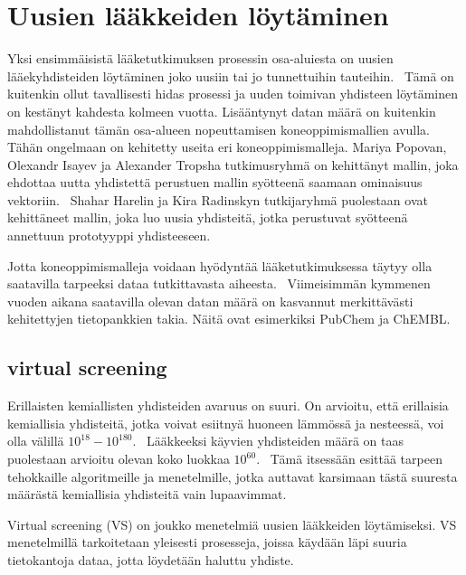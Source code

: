 \documentclass[finnish,twoside,censored,subject,sw-line]{HYthesisML}
\begin{document}
\chapter{Uusien lääkkeiden löytäminen}


Yksi ensimmäisistä lääketutkimuksen prosessin osa-aluiesta on uusien lääekyhdisteiden löytäminen joko uusiin tai jo tunnettuihin tauteihin.~\cite{EkinsSean2019Emlf}
Tämä on kuitenkin ollut tavallisesti hidas prosessi ja uuden toimivan yhdisteen löytäminen on kestänyt kahdesta kolmeen vuotta.
Lisääntynyt datan määrä on kuitenkin mahdollistanut tämän osa-alueen nopeuttamisen koneoppimismallien avulla.
Tähän ongelmaan on kehitetty useita eri koneoppimismalleja.
Mariya Popovan, Olexandr Isayev ja Alexander Tropsha tutkimusryhmä on kehittänyt mallin, joka ehdottaa uutta yhdistettä perustuen mallin syötteenä saamaan ominaisuus vektoriin.~\cite{PopovaMariya2018Drlf}
Shahar Harelin ja Kira Radinskyn tutkijaryhmä puolestaan ovat kehittäneet mallin, joka luo uusia yhdisteitä, jotka perustuvat syötteenä annettuun prototyyppi yhdisteeseen.~\cite{ShaharHarelAndKiraRadinsky}

Jotta koneoppimismalleja voidaan hyödyntää lääketutkimuksessa täytyy olla saatavilla tarpeeksi dataa tutkittavasta aiheesta.~\cite{EkinsSean2019Emlf}
Viimeisimmän kymmenen vuoden aikana saatavilla olevan datan määrä on kasvannut merkittävästi kehitettyjen tietopankkien takia.
Näitä ovat esimerkiksi PubChem ja ChEMBL.

\section{virtual screening}

Erillaisten kemiallisten yhdisteiden avaruus on suuri.
On arvioitu, että erillaisia kemiallisia yhdisteitä, jotka voivat esiitnyä huoneen lämmössä ja nesteessä, voi olla välillä $10^{18} - 10^{180}$.~\cite{SotrifferChristoph2011VSPC}
Lääkkeeksi käyvien yhdisteiden määrä on taas puolestaan arvioitu olevan koko luokkaa $10^{60}$.~\cite{SotrifferChristoph2011VSPC}
Tämä itsessään esittää tarpeen tehokkaille algoritmeille ja menetelmille, jotka auttavat karsimaan tästä suuresta määrästä kemiallisia yhdisteitä vain lupaavimmat.

Virtual screening (VS) on joukko menetelmiä uusien lääkkeiden löytämiseksi.
VS menetelmillä tarkoitetaan yleisesti prosesseja, joissa käydään läpi suuria tietokantoja dataa, jotta löydetään haluttu yhdiste.~\cite{SotrifferChristoph2011VSPC}
\end{document}
